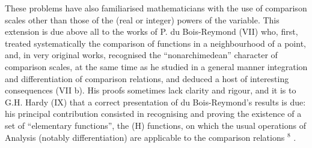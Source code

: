 These problems have also familiarised mathematicians with the use of comparison scales other than those of the (real or integer) powers of the variable. This extension is due above all to the works of P. du Bois-Reymond (VII) who, first, treated systematically the comparison of functions in a neighbourhood of a point, and, in very original works, recognised the ``nonarchimedean'' character of comparison scales, at the same time as he studied in a general manner integration and differentiation of comparison relations, and deduced a host of interesting consequences (VII b). His proofs sometimes lack clarity and rigour, and it is to G.H. Hardy (IX) that a correct presentation of du Bois-Reymond's results is due: his principal contribution consisted in recognising and proving the existence of a set of ``elementary functions'', the (H) functions, on which the usual operations of Analysis (notably differentiation) are applicable to the comparison relations \({}^{8}\) .

